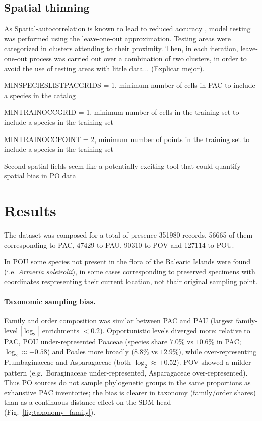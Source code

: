 \documentclass{article}
\begin{document}
\subsection{Spatial thinning}

As Spatial-autocorrelation is known to lead to reduced accuracy \cite{KOLDASBAYEVA2025103521}, model testing was performed using the leave-one-out approximation. Testing areas were categorized in clusters attending to their proximity. Then, in each iteration, leave-one-out process was carried out over a combination of two clusters, in order to avoid the use of testing areas with little data... (Explicar mejor). 

MINSPECIESLISTPACGRIDS = 1, minimum number of cells in PAC to include a species in the catalog

MINTRAINOCCGRID = 1, minimum number of cells in the training set to include a species in the training set

MINTRAINOCCPOINT = 2, minimum number of points in the training set to include a species in the training set


Second spatial fields seem like a potentially exciting tool that could quantify spatial bias in PO data \cite{simmonds2020more}


\section{Results}

The dataset was composed for a total of presence 351980 records,  56665 of them corresponding to PAC, 47429 to PAU, 90310 to POV and 127114 to POU.

In POU some species not present in the flora of the Balearic Islands were found (i.e. \textit{Armeria soleirolii}), in some cases corresponding to preserved specimens with coordinates respresenting their current location, not thair original sampling point.

\paragraph{Taxonomic sampling bias.}
Family and order composition was similar between PAC and PAU (largest family-level $|\log_2|$ enrichments $<0.2$). Opportunistic levels diverged more: relative to PAC, POU under-represented Poaceae (species share $7.0\%$ vs $10.6\%$ in PAC; $\log_2\approx-0.58$) and Poales more broadly ($8.8\%$ vs $12.9\%$), while over-representing Plumbaginaceae and Asparagaceae (both $\log_2\approx+0.52$). POV showed a milder pattern (e.g.\ Boraginaceae under-represented, Asparagaceae over-represented). Thus PO sources do not sample phylogenetic groups in the same proportions as exhaustive PAC inventories; the bias is clearer in taxonomy (family/order shares) than as a continuous distance effect on the SDM head (Fig.~\ref{fig:taxonomy_family}).
\end{document}
